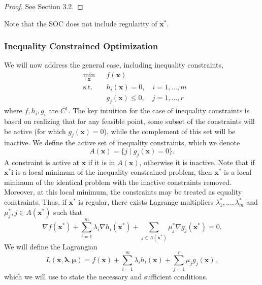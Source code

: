 \begin{proof}
See \cite{bertsekas2016nonlinear} Section 3.2.
\end{proof}
Note that the SOC does not include regularity of $\bm{x}^*$. 

\subsubsection{Inequality Constrained Optimization}

We will now address the general case, including inequality constraints,
\begin{equation*}
\begin{aligned}
& \underset{\bm{x}}{\min}
& & f(\bm{x})\\
& \textrm{s.t.} & & h_i(\bm{x}) = 0, \quad i = 1, \ldots, m\\
& & & g_j(\bm{x}) \leq 0, \quad j = 1, \ldots, r
\end{aligned}
\end{equation*}
where $f,h_i,g_i$ are $C^1$. The key intuition for the case of  inequality constraints is based on realizing that for any feasible point, some subset of the constraints will be active (for which $g_j(\bm{x}) = 0$), while the complement of this set will be inactive. We define the active set of inequality constraints, which we denote 
\begin{equation}
    A(\bm{x}) = \{j \mid g_j(\bm{x}) = 0\}.
\end{equation}
A constraint is active at $\bm{x}$ if it is in $A(\bm{x})$, otherwise it is inactive. Note that if $\bm{x}^*$i is a local minimum of the inequality constrained problem, then $\bm{x}^*$ is a local minimum of the identical problem with the inactive constraints removed. Moreover, at this local minimum, the constraints may be treated as equality constraints. Thus, if $\bm{x}^*$ is regular, there exists Lagrange multipliers $\lambda_1^*, \ldots, \lambda_m^*$ and $\mu_j^*, j \in A(\bm{x}^*)$ such that 
\begin{equation}
\nabla f(\bm{x}^*) + \sum^m_{i=1} \lambda_i \nabla h_i(\bm{x}^*) + \sum_{j \in A(\bm{x}^*)} \mu_j^* \nabla g_j(\bm{x}^*)= 0.    
\end{equation}
We will define the Lagrangian
\begin{equation}
    L(\bm{x},\bm{\lambda}, \bm{\mu}) = f(\bm{x}) + \sum^m_{i=1} \lambda_i h_i(\bm{x}) + \sum_{j =1}^r \mu_j  g_j(\bm{x}),
\end{equation}
which we will use to state the necessary and sufficient conditions. 

